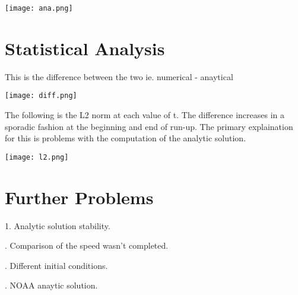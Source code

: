 \documentclass{article}
\begin{document}
\texttt{[image: ana.png]}

\section{Statistical Analysis}

This is the difference between the two ie. numerical - anaytical

\texttt{[image: diff.png]}

\noindent The following is the L2 norm at each value of t. The difference increases in a sporadic fashion at the beginning and end of run-up. The primary explaination for this is problems with the computation of the analytic solution.


\texttt{[image: l2.png]}

\section{Further Problems}

1. Analytic solution stability.

. Comparison of the speed wasn't completed.

. Different initial conditions.

. NOAA anaytic solution.
\end{document}
